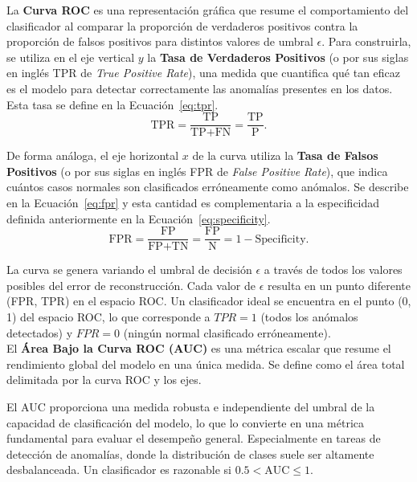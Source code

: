 \documentclass[a4paper,10pt]{book}
\begin{document}
La \textbf{Curva ROC} es una representación gráfica que resume el comportamiento del clasificador al comparar la proporción de verdaderos positivos contra la proporción de falsos positivos para distintos valores de umbral $\epsilon$. Para construirla, se utiliza en el eje vertical $y$ la \textbf{Tasa de Verdaderos Positivos} (o por sus siglas en inglés TPR de \emph{True Positive Rate}), una medida que cuantifica qué tan eficaz es el modelo para detectar correctamente las anomalías presentes en los datos. Esta tasa se define en la Ecuación~\ref{eq:tpr}.
\begin{equation}
	\text{TPR} = \frac{\text{TP}}{\text{TP} + \text{FN}}
	= \frac{\text{TP}}{\text{P}}.
	\label{eq:tpr}
\end{equation}

De forma análoga, el eje horizontal $x$ de la curva utiliza la \textbf{Tasa de Falsos Positivos} (o por sus siglas en inglés FPR de \emph{False Positive Rate}), que indica cuántos casos normales son clasificados erróneamente como anómalos. Se describe en la Ecuación~\ref{eq:fpr} y esta cantidad es complementaria a la especificidad definida anteriormente en la Ecuación~\ref{eq:specificity}.
\begin{equation}
	\text{FPR} = \frac{\text{FP}}{\text{FP} + \text{TN}}
	= \frac{\text{FP}}{\text{N}}
	= 1 - \text{Specificity}.
	\label{eq:fpr}
\end{equation}

La curva se genera variando el umbral de decisión $\epsilon$ a través de todos los valores posibles del error de reconstrucción. Cada valor de $\epsilon$ resulta en un punto diferente (FPR, TPR) en el espacio ROC. Un clasificador ideal se encuentra en el punto (0, 1) del espacio ROC, lo que corresponde a $TPR=1$ (todos los anómalos detectados) y $FPR=0$ (ningún normal clasificado erróneamente).\\

El \textbf{Área Bajo la Curva ROC (AUC)} es una métrica escalar que resume el rendimiento global del modelo en una única medida. Se define como el área total delimitada por la curva ROC y los ejes.

El AUC proporciona una medida robusta e independiente del umbral de la capacidad de clasificación del modelo, lo que lo convierte en una métrica fundamental para evaluar el desempeño general. Especialmente en tareas de detección de anomalías, donde la distribución de clases suele ser altamente desbalanceada. Un clasificador es razonable si $0.5 < \text{AUC} \leq 1$.
\end{document}
